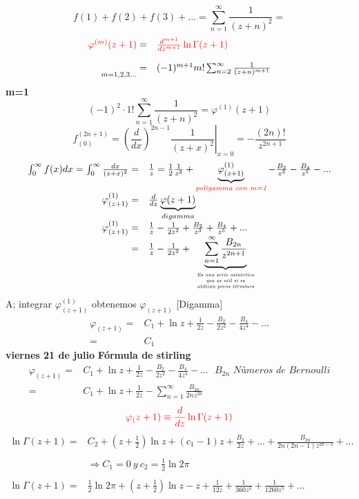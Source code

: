 \documentclass{article}
\theoremstyle{definition}
\begin{document}
\[f(1)+f(2)+f(3)+...=\sum^{\infty}_{n=1}\frac{1}{(z+n)^2}=\]
\[
\begin{array}{rl}
	\textcolor{red}{\varphi^{(m)}(z+1)}=&\textcolor{red}{\frac{d^{m+1}}{dz^{m+1}}\ln \Gamma (z+1)}\\
	\\
	\underset{m=1,2,3...}{ }=& (-1)^{m+1}m!\sum^{\infty}_{n=2}\frac{1}{(z+n)^{m+1}}
\end{array}
\]
\textbf{m=1}
\[(-1)^2\cdot 1!\sum^{\infty}_{n=1}\frac{1}{(z+n)^2}=\varphi^{(1)}(z+1)\]
\[f^{(2n+1)}_{(0)}=\left.\left(\frac{d}{dx}\right)^{2n-1}\frac{1}{(z+x)^2}\right|_{x=0}=-\frac{(2n)!}{z^{2n+1}}\]
\[
\begin{array}{rl}
	\int^{\infty}_0f(x)dx=\int^{\infty}_0\frac{dx}{(z+x)^2}=&\frac{1}{z}=\frac{1}{2}\frac{1}{z^2}+\underbrace{\varphi ^{(1)}_{(z+1)}}_{\textcolor{red}{\textit{poligamma con m=1}}}-\frac{B_2}{z^3}-\frac{B_4}{z^5}-...\\
	\varphi ^{(1)}_{(z+1)}=& \frac{d}{dz}\underbrace{\varphi (z+1)}_{digamma}\\
	\varphi ^{(1)}_{(z+1)}=&\frac{1}{z}-\frac{1}{2z^2}+\frac{B_2}{z^3}+\frac{B_4}{z^5}+...\\
	=& \frac{1}{z}-\frac{1}{2z^2}+\underbrace{\sum^{\infty}_{n=1}\frac{B_{2n}}{z^{2n+1}}}_{
	\begin{tiny}
	\begin{array}{c}
		\textit{Es una serie asintotica}\\
		\textit{que es util si se}\\
		\textit{utilizan pocos términos}
	\end{array}		
	\end{tiny}			
	}
\end{array}\]
A; integrar $\varphi ^{(1)}_{(z+1)}$ obtenemos $\varphi _{(z+1)}$ [Digamma]
\[
\begin{array}{rl}
	\varphi_{(z+1)}=& C_1+\ln z+\frac{1}{2z}-\frac{B_2}{2z^2}-\frac{B_4}{4z^4}-...\\
	=& C_1
\end{array}
\]
\newpage
\textbf{viernes 21 de julio}
\textbf{Fórmula de stirling}
\[
\begin{array}{rl}
	\varphi_{(z+1)}=& C_1 +\ln z+ \frac{1}{2z}-\frac{B_2}{2z^2}-\frac{B_4}{4z^4}-...\ \ \ B_{2n} \textit{ Números de Bernoulli}\\
	=& C_1 +\ln z+ \frac{1}{2z}-\sum^{\infty}_{n=1}\frac{B_{2n}}{2nz^{2n}}
\end{array}
\]
\[\textcolor{red}{\varphi_(z+1)\equiv \frac{d}{dz} \ln \Gamma (z+1)}\]
\[
\begin{array}{rl}
	\ln \Gamma (z+1) =& C_2 +\left(z+\frac{1}{2}\right) \ln z + (c_1-1)z+\frac{B_2}{2z}+...+ \frac{B_{2n}}{2n(2n-1)z^{2n-1}}+...\\
	\\
	&\Rightarrow C_1=0\ y \ c_2=\frac{1}{2}\ln 2\pi\\
	\\
	\ln \Gamma (z+1) =&\frac{1}{2} \ln 2\pi + \left(z+\frac{1}{2}\right) \ln z -z+\frac{1}{12z}+\frac{1}{360z^3}+\frac{1}{1260z^5}+...\\
\end{array}
\]
\end{document}
